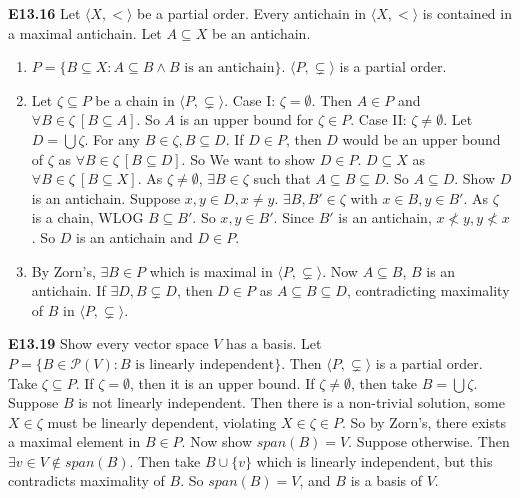 \documentclass[10pt, landscape]{article}
\begin{document}
\begin{multicols*}{3}
\textbf{E13.16} Let $\langle X, < \rangle$ be a partial order. Every antichain in $\langle X, < \rangle$ is contained in a maximal antichain. Let $A \subseteq X$ be an antichain.
\begin{enumerate}
    \item $P=\{B\subseteq X:A\subseteq B\land B\text{ is an antichain}\}$. $\langle P, \subsetneq\rangle$ is a partial order.
    \item Let $\zeta \subseteq P$ be a chain in $\langle P, \subsetneq\rangle$. Case I: $\zeta=\emptyset$. Then $A\in P$ and $\forall B \in \zeta \ [B \subseteq A]$. So $A$ is an upper bound for $\zeta \in P$. Case II: $\zeta\neq\emptyset$. Let $D=\bigcup \zeta$. For any $B \in \zeta, B\subseteq D$. If $D \in P$, then $D$ would be an upper bound of $\zeta$ as $\forall B \in \zeta \ [B\subseteq D]$. So We want to show $D \in P$. $D\subseteq X$ as $\forall B \in \zeta \ [B \subseteq X]$. As $\zeta \neq \emptyset$, $\exists B \in \zeta$ such that $A\subseteq B \subseteq D$. So $A \subseteq D$. Show $D$ is an antichain. Suppose $x, y \in D, x\neq y$. $\exists B, B' \in \zeta$ with $x\in B, y \in B'$. As $\zeta$ is a chain, WLOG $B \subseteq B'$. So $x, y \in B'$. Since $B'$ is an antichain, $x \not< y, y \not< x$. So $D$ is an antichain and $D \in P$.
    \item By Zorn's, $\exists B \in P$ which is maximal in $\langle P, \subsetneq \rangle$. Now $A \subseteq B$, $B$ is an antichain. If $\exists D, B \subsetneq D$, then $D \in P$ as $A \subseteq B \subseteq D$, contradicting maximality of $B$ in $\langle P, \subsetneq \rangle$.
\end{enumerate}

\textbf{E13.19} Show every vector space $V$ has a basis. Let $P=\{B\in\mathcal{P}(V):B \text{ is linearly independent}\}$. Then $\langle P, \subsetneq \rangle$ is a partial order. Take $\zeta \subseteq P$. If $\zeta=\emptyset$, then it is an upper bound. If $\zeta\neq\emptyset$, then take $B=\bigcup \zeta$. Suppose $B$ is not linearly independent. Then there is a non-trivial solution, some $X \in \zeta$ must be linearly dependent, violating $X\in \zeta \in P$. So by Zorn's, there exists a maximal element in $B \in P$. Now show $span(B)=V$. Suppose otherwise. Then $\exists v \in V\notin span(B)$. Then take $B \cup \{v\}$ which is linearly independent, but this contradicts maximality of $B$. So $span(B)=V$, and $B$ is a basis of $V$. 


\end{multicols*}
\end{document}
